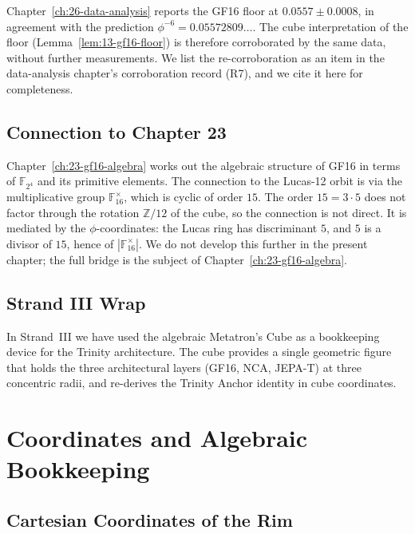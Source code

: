 Chapter~\ref{ch:26-data-analysis} reports the GF16 floor at
$0.0557 \pm 0.0008$, in agreement with the prediction
$\phi^{-6} = 0.05572809\ldots$. The cube interpretation of the
floor (Lemma~\ref{lem:13-gf16-floor}) is therefore corroborated by
the same data, without further measurements. We list the
re-corroboration as an item in the data-analysis chapter's
corroboration record (R7), and we cite it here for completeness.

\subsection{Connection to Chapter 23}
\label{fa_13:sec:13-conn-23}

Chapter~\ref{ch:23-gf16-algebra} works out the algebraic structure
of GF16 in terms of $\mathbb{F}_{2^{4}}$ and its primitive elements.
The connection to the Lucas-12 orbit is via the multiplicative
group $\mathbb{F}_{16}^{\times}$, which is cyclic of order $15$.
The order $15 = 3 \cdot 5$ does not factor through the rotation
$\mathbb{Z}/12$ of the cube, so the connection is not direct. It
is mediated by the $\phi$-coordinates: the Lucas ring has
discriminant $5$, and $5$ is a divisor of $15$, hence of
$|\mathbb{F}_{16}^{\times}|$. We do not develop this further in the
present chapter; the full bridge is the subject of
Chapter~\ref{ch:23-gf16-algebra}.

\subsection{Strand III Wrap}
\label{fa_13:sec:13-strand-III-wrap}

In Strand~III we have used the algebraic Metatron's Cube as a
bookkeeping device for the Trinity architecture. The cube provides
a single geometric figure that holds the three architectural layers
(GF16, NCA, JEPA-T) at three concentric radii, and re-derives the
Trinity Anchor identity in cube coordinates.


\section{Coordinates and Algebraic Bookkeeping}
\label{fa_13:sec:13-coords-bookkeeping}

\subsection{Cartesian Coordinates of the Rim}
\label{fa_13:sec:13-cartesian-rim}


